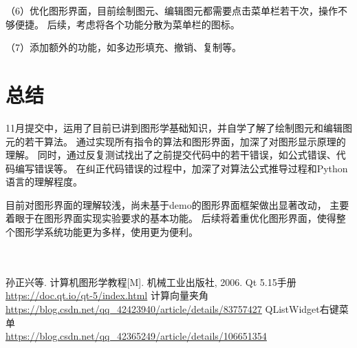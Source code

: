 \documentclass[a4paper,UTF8]{article}
\begin{document}
（6）优化图形界面，目前绘制图元、编辑图元都需要点击菜单栏若干次，操作不够便捷。
后续，考虑将各个功能分散为菜单栏的图标。

（7）添加额外的功能，如多边形填充、撤销、复制等。


\section{总结}
11月提交中，运用了目前已讲到图形学基础知识，并自学了解了绘制图元和编辑图元的若干算法。
通过实现所有指令的算法和图形界面，加深了对图形显示原理的理解。
同时，通过反复测试找出了之前提交代码中的若干错误，如公式错误、代码编写错误等。
在纠正代码错误的过程中，加深了对算法公式推导过程和Python语言的理解程度。

目前对图形界面的理解较浅，尚未基于demo的图形界面框架做出显著改动，
主要着眼于在图形界面实现实验要求的基本功能。
后续将着重优化图形界面，使得整个图形学系统功能更为多样，使用更为便利。
\\\\\\




\begin{thebibliography}{99}
 孙正兴等. 计算机图形学教程[M]. 机械工业出版社, 2006.
 Qt 5.15手册\\\url{https://doc.qt.io/qt-5/index.html}
 计算向量夹角\\\url{https://blog.csdn.net/qq_42423940/article/details/83757427}
 QListWidget右键菜单\\\url{https://blog.csdn.net/qq_42365249/article/details/106651354}

\end{thebibliography}
\end{document}
